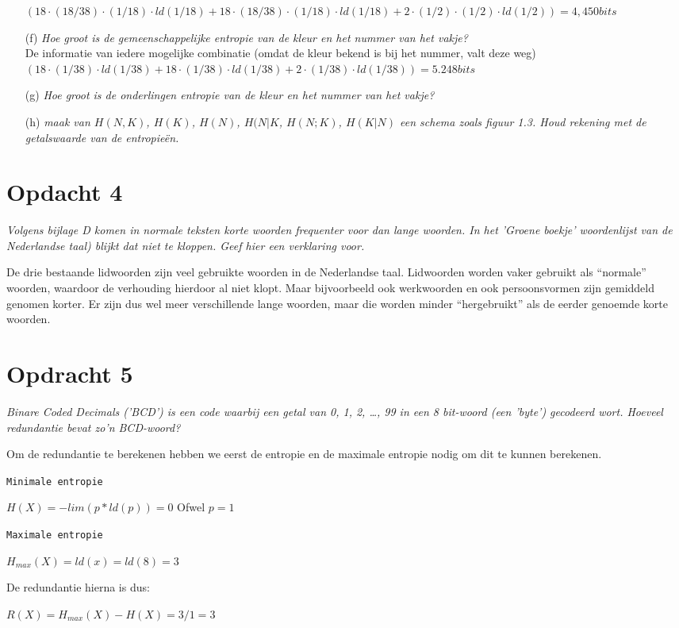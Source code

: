 \begin{itemize}
     $(18 \cdot (18/38) \cdot (1/18) \cdot ld(1/18) + 18 \cdot (18/38) \cdot (1/18) \cdot ld(1/18) + 2 \cdot (1/2) \cdot (1/2) \cdot ld(1/2)) = 4,450 bits$    

  \item[(f)] \emph{Hoe groot is de gemeenschappelijke entropie van de kleur en het nummer van het vakje?}\\
    
    De informatie van iedere mogelijke combinatie (omdat de kleur bekend is bij het nummer, valt deze weg)\\
    $(18 \cdot (1/38) \cdot ld(1/38) + 18 \cdot (1/38) \cdot ld(1/38) + 2 \cdot (1/38) \cdot ld(1/38)) = 5.248 bits$

  \item[(g)] \emph{Hoe groot is de onderlingen entropie van de kleur en het nummer van het vakje?}
    
    

  \item[(h)] \emph{maak van $H(N,K)$, $H(K)$, $H(N)$, $H(N|K$, $H(N;K)$, $H(K|N)$ een schema zoals figuur 1.3. Houd rekening met de getalswaarde van de entropie\"{e}n.}
\end{itemize}


\section{Opdacht 4}
\emph{Volgens bijlage D komen in normale teksten korte woorden frequenter voor dan lange woorden. In het 'Groene boekje' woordenlijst van de Nederlandse taal) blijkt dat niet te kloppen.  Geef hier een verklaring voor.}

De drie bestaande lidwoorden zijn veel gebruikte woorden in de Nederlandse taal. Lidwoorden worden vaker gebruikt als ``normale'' woorden, waardoor de verhouding hierdoor al niet klopt. Maar bijvoorbeeld ook werkwoorden en ook persoonsvormen zijn gemiddeld genomen korter. Er zijn dus wel meer verschillende lange woorden, maar die worden minder ``hergebruikt'' als de eerder genoemde korte woorden. 

\section{Opdracht 5}
\emph{Binare Coded Decimals ('BCD') is een code waarbij een getal van 0, 1, 2, \ldots, 99 in een 8 bit-woord (een '\emph{byte}') gecodeerd wort. Hoeveel redundantie bevat zo'n BCD-woord?}

Om de redundantie te berekenen hebben we eerst de entropie en de maximale entropie nodig om dit te kunnen berekenen.

\texttt{Minimale entropie}

$H(X)=-lim(p*ld(p))=0$
Ofwel
$p=1$

\texttt{Maximale entropie}

$H_{max}(X)=ld(x)=ld(8)=3$

De redundantie hierna is dus:

$R(X)=H_{max}(X)-H(X)=3/1=3$
